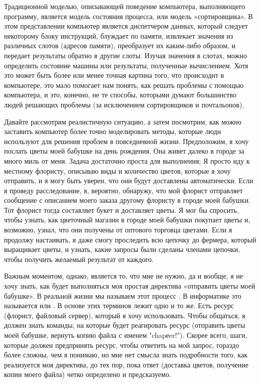 \secdown

Традиционной моделью, описывающей поведение компьютера, выполняющего программу, 
является модель состояния процесса, или модель «сортировщика». В этом 
представлении компьютер является диспетчером данных, который следует некоторому 
блоку инструкций, блуждает по памяти, извлекает значения из различных слотов 
(адресов памяти), преобразует их каким-либо образом, и передает результаты 
обратно в другие слоты. Изучая значения в слотах, можно определить состояние 
машины или результаты, полученные вычислением. Хотя это может быть более или 
менее точная картина того, что происходит в компьютере, это мало помогает нам 
понять, как решать проблемы с помощью компьютера, и это, конечно, не те способы, 
которыми думают большинство людей решающих проблемы (за исключением сортировщиков и почтальонов).

Давайте рассмотрим реалистичную ситуацию, а затем посмотрим, как можно заставить 
компьютер более точно моделировать методы, которые люди используют для решения 
проблем в повседневной жизни. Предположим, я хочу послать цветы моей бабушке 
на день рождения. Она живет далеко в городе за много миль от меня. Задача 
достаточно проста для выполнения; Я просто иду к местному флористу, описываю 
виды и количество цветов, которые я хочу отправить, и я могу быть уверен, 
что они будут доставлены автоматически. Если я проведу расследование, я, 
вероятно, обнаружу, что мой флорист отправляет сообщение с описанием моего 
заказа другому флористу в городе моей бабушки. Тот флорист тогда составляет 
букет и доставляет цветы. Я мог бы спросить, чтобы узнать, как цветочный 
магазин в городе моей бабушки покупает цветы и, возможно, узнал, что они 
получены от оптового торговца цветами. Если я продолжу настаивать, я даже 
смогу проследить всю цепочку до фермера, который выращивает цветы, и узнать, 
какие запросы были сделаны членами цепочки, чтобы получить желаемый результат от каждого.

Важным моментом, однако, является то, что мне не нужно, да и вообще, 
я не хочу знать, как будет выполняться моя простая директива 
«отправить цветы моей бабушке». В реальной жизни мы называем этот 
процесс . В информатике это называется 
 или . В основе этих терминов лежит 
одно и то же. Есть ресурс (флорист, файловый сервер), который я хочу 
использовать. Чтобы общаться, я должен знать команды, на которые будет 
реагировать ресурс (отправить цветы моей бабушке, вернуть копию файла 
с именем "chapеer!"). Скорее всего, шаги, которые должен предпринять 
ресурс, чтобы ответить на мой запрос, гораздо более сложны, чем я 
понимаю, но мне нет смысла знать подробности того, как реализуется 
моя директива, до тех пор, пока ответ (доставка цветов, получение 
копии моего файла) четко определено и предсказуемо.

